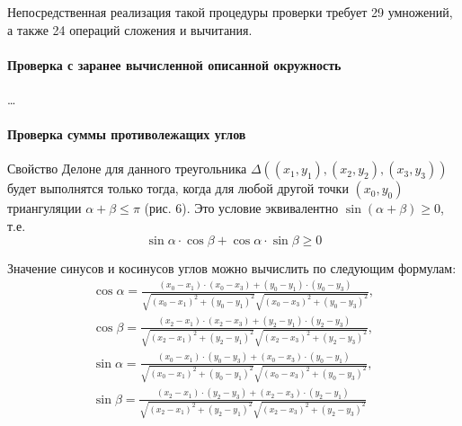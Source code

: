 \documentclass{fefu}
\begin{document}
Непосредственная реализация такой процедуры проверки требует 29 умножений, а также 24 операций  сложения и вычитания.
\paragraph{Проверка с заранее вычисленной описанной окружность}
\dots
\paragraph{Проверка суммы противолежащих углов}
Свойство Делоне для данного треугольника $\Delta \left((x_1, y_1), (x_2, y_2), (x_3, y_3)\right)$ будет выполнятся
только тогда, когда для любой другой точки $(x_0, y_0)$ триангуляции $\alpha + \beta \leq \pi$ (рис. 6). Это условие
эквивалентно $\sin\left(\alpha + \beta\right) \geq 0$, т.е.
\[
    \sin\alpha \cdot \cos\beta + \cos\alpha \cdot \sin\beta \geq 0
\]

Значение синусов и косинусов углов можно вычислить по следующим формулам:
\[
    \begin{matrix}
        \cos\alpha = \frac{(x_0 - x_1)\cdot(x_0 - x_3) + (y_0 - y_1)\cdot(y_0 - y_3)}{\sqrt{(x_0 - x_1)^2 + (y_0 - y_1)^2}
    \sqrt{(x_0 - x_3)^2 + (y_0 - y_3)^2}},\\
    \cos\beta = \frac{(x_2 - x_1)\cdot(x_2 - x_3) + (y_2 - y_1)\cdot(y_2 - y_3)}{\sqrt{(x_2 - x_1)^2 + (y_2 - y_1)^2}
    \sqrt{(x_2 - x_3)^2 + (y_2 - y_3)^2}},\\
    \sin\alpha = \frac{(x_0 - x_1)\cdot(y_0 - y_3) + (x_0 - x_3)\cdot(y_0 - y_1)}{\sqrt{(x_0 - x_1)^2 + (y_0 - y_1)^2}
    \sqrt{(x_0 - x_3)^2 + (y_0 - y_3)^2}},\\
    \sin\beta = \frac{(x_2 - x_1)\cdot(y_2 - y_3) + (x_2 - x_3)\cdot(y_2 - y_1)}{\sqrt{(x_2 - x_1)^2 + (y_2 - y_1)^2}
    \sqrt{(x_2 - x_3)^2 + (y_2 - y_3)^2}}
    \end{matrix}
\]
\end{document}
